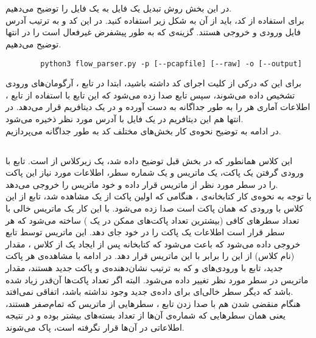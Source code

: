 \section{}
در این بخش روش تبدیل یک فایل
به یک فایل
را توضیح می‌دهیم.\\
برای استفاده از کد، باید از آن به شکل زیر استفاده کنید. 
در این کد
و
به ترتیب آدرس فایل ورودی و خروجی هستند.
گزینه‌ی  که به طور پیشفرض غیرفعال است را در انتها توضیح می‌دهیم. 
\begin{latin}
	\begin{verbatim}
		python3 flow_parser.py -p [--pcapfile] [--raw] -o [--output]	
	\end{verbatim}
\end{latin}
برای این که درکی از کلیت اجرای کد داشته باشید، ابتدا در تابع ، آرگومان‌های ورودی تشخیص داده می‌شوند، سپس تابع  صدا زده می‌شود که این تابع با استفاده از تابع ، اطلاعات  آماری هر  را به طور جداگانه به دست آورده و در یک دیتافریم  قرار می‌دهد. در انتها هم این دیتافریم در یک فایل  با آدرس مورد نظر ذخیره می‌شود.\\
در ادامه به توضیح نحوه‌ی کار بخش‌های مختلف کد به طور جداگانه می‌پردازیم.
\subsection{}
این کلاس همانطور که در بخش قبل توضیح داده شد، یک زیرکلاس از  است. تابع 
با ورودی گرفتن یک پاکت، یک ماتریس و یک شماره سطر، اطلاعات مورد نیاز این پاکت را در سطر مورد نظر از ماتریس قرار داده و خود ماتریس را خروجی می‌دهد.\\
با توجه به نحوه‌ی کار کتابخانه‌ی ، هنگامی که اولین پاکت از یک  مشاهده شد، تابع  از این کلاس با ورودی
که همان پاکت است صدا زده می‌شود. با این کار یک ماتریس خالی با تعداد سطر‌های کافی (بیشترین تعداد پاکت‌های ممکن در یک ) ساخته می‌شود که هر سطر قرار است اطلاعات یک پاکت را در خود جای دهد. این ماتریس توسط تابع خروجی داده می‌شود که باعث می‌شود که کتابخانه پس از ایجاد یک  از کلاس ، مقدار 
(نام کلاس) از این  را برابر با این ماتریس قرار دهد. در ادامه با مشاهده‌ی هر پاکت جدید، تابع 
با ورودی‌های
و
که به ترتیب نشان‌دهنده‌ی  و پاکت جدید هستند، مقدار ماتریس در سطر مورد نظر تغییر داده می‌شود. البته اگر تعداد پاکت‌ها آن‌قدر زیاد شده باشد که دیگر سطر خالی‌ای برای داده‌ی جدید وجود نداشته باشد، اتفاقی نمی‌افتد.\\
هنگام منقضی شدن  هم با صدا زدن تابع ، سطر‌هایی از ماتریس که تمام‌صفر هستند، یعنی همان سطر‌هایی که شماره‌ی آن‌ها از تعداد بسته‌های  بیشتر بوده و در نتیجه اطلاعاتی در آن‌ها قرار نگرفته است، پاک می‌شوند.\\
